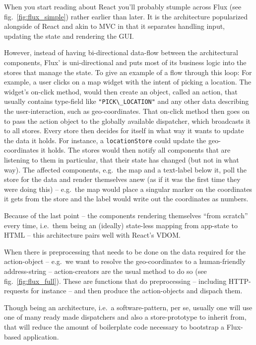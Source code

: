 \documentclass[a4paper,,tablecaptionabove]{scrbook}
\newcommand{\passthrough}[1]{#1}
\begin{document}
When you start reading about React you'll probably stumple across Flux
(see fig.~\ref{fig:flux_simple}) rather earlier than later. It is the
architecture popularized alongside of React and akin to MVC in that it
separates handling input, updating the state and rendering the GUI.

However, instead of having bi-directional data-flow between the
architectural components, Flux' is uni-directional and puts most of its
business logic into the stores that manage the state. To give an example
of a flow through this loop: For example, a user clicks on a map widget
with the intent of picking a location. The widget's on-click method,
would then create an object, called an action, that usually contains
type-field like \passthrough{\lstinline!"PICK\_LOCATION"!} and any other
data describing the user-interaction, such as geo-coordinates. That
on-click method then goes on to pass the action object to the globally
available dispatcher, which broadcasts it to all stores. Every store
then decides for itself in what way it wants to update the data it
holds. For instance, a \passthrough{\lstinline!locationStore!} could
update the geo-coordinates it holds. The stores would then notify all
components that are listening to them in particular, that their state
has changed (but not in what way). The affected components, e.g.~the map
and a text-label below it, poll the store for the data and render
themselves anew (as if it was the first time they were doing this) --
e.g.~the map would place a singular marker on the coordinates it gets
from the store and the label would write out the coordinates as numbers.

Because of the last point -- the components rendering themselves
\enquote{from scratch} every time, i.e.~them being an (ideally)
state-less mapping from app-state to HTML -- this architecture pairs
well with React's VDOM.

When there is preprocessing that needs to be done on the data required
for the action-object -- e.g.~we want to resolve the geo-coordinates to
a human-friendly address-string -- action-creators are the usual method
to do so (see fig.~\ref{fig:flux_full}). These are functions that do
preprocessing -- including HTTP-requests for instance -- and then
produce the action-objects and dispach them.

Though being an architecture, i.e.~a software-pattern, per se, usually
one will use one of many ready made dispatchers and also a
store-prototype to inherit from, that will reduce the amount of
boilerplate code necessary to bootstrap a Flux-based application.
\end{document}
